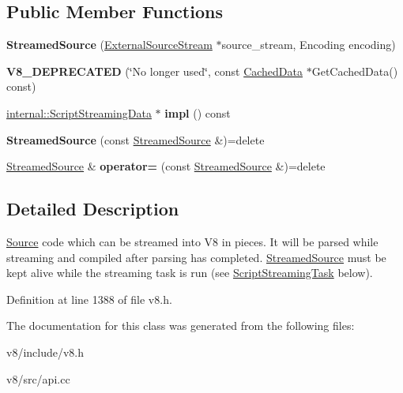 \subsection*{Public Member Functions}
\begin{DoxyCompactItemize}
\item 
\mbox{\label{classv8_1_1ScriptCompiler_1_1StreamedSource_a4da404a49e48a12927c743797833d8aa}} 
{\bfseries Streamed\+Source} (\mbox{\hyperlink{classv8_1_1ScriptCompiler_1_1ExternalSourceStream}{External\+Source\+Stream}} $\ast$source\+\_\+stream, Encoding encoding)
\item 
\mbox{\label{classv8_1_1ScriptCompiler_1_1StreamedSource_a1aa7e890f0694cc3ed9b419fdb5d71e4}} 
{\bfseries V8\+\_\+\+D\+E\+P\+R\+E\+C\+A\+T\+ED} (\char`\"{}No longer used\char`\"{}, const \mbox{\hyperlink{structv8_1_1ScriptCompiler_1_1CachedData}{Cached\+Data}} $\ast$Get\+Cached\+Data() const)
\item 
\mbox{\label{classv8_1_1ScriptCompiler_1_1StreamedSource_a45714bf012e619379d70707b535c8224}} 
\mbox{\hyperlink{structv8_1_1internal_1_1ScriptStreamingData}{internal\+::\+Script\+Streaming\+Data}} $\ast$ {\bfseries impl} () const
\item 
\mbox{\label{classv8_1_1ScriptCompiler_1_1StreamedSource_ac0024da49305c2d8de1a61348c1c8880}} 
{\bfseries Streamed\+Source} (const \mbox{\hyperlink{classv8_1_1ScriptCompiler_1_1StreamedSource}{Streamed\+Source}} \&)=delete
\item 
\mbox{\label{classv8_1_1ScriptCompiler_1_1StreamedSource_ab2425dcd427fcdfaf6ac0d0cd295bcbb}} 
\mbox{\hyperlink{classv8_1_1ScriptCompiler_1_1StreamedSource}{Streamed\+Source}} \& {\bfseries operator=} (const \mbox{\hyperlink{classv8_1_1ScriptCompiler_1_1StreamedSource}{Streamed\+Source}} \&)=delete
\end{DoxyCompactItemize}


\subsection{Detailed Description}
\mbox{\hyperlink{classv8_1_1ScriptCompiler_1_1Source}{Source}} code which can be streamed into V8 in pieces. It will be parsed while streaming and compiled after parsing has completed. \mbox{\hyperlink{classv8_1_1ScriptCompiler_1_1StreamedSource}{Streamed\+Source}} must be kept alive while the streaming task is run (see \mbox{\hyperlink{classv8_1_1ScriptCompiler_1_1ScriptStreamingTask}{Script\+Streaming\+Task}} below). 

Definition at line 1388 of file v8.\+h.



The documentation for this class was generated from the following files\+:\begin{DoxyCompactItemize}
\item 
v8/include/v8.\+h\item 
v8/src/api.\+cc\end{DoxyCompactItemize}
